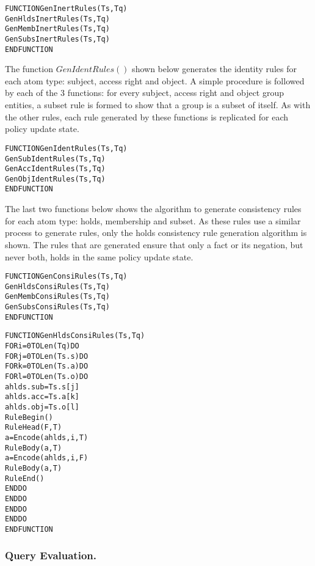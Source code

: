 \documentclass[global,twocolumn,final]{svjour}
\newenvironment{vverbatim}
  {\begin{alltt}}
  {\vspace{-\baselineskip}\end{alltt}}
\begin{document}
          \begin{vverbatim}
FUNCTION GenInertRules(Ts, Tq)
  GenHldsInertRules(Ts, Tq)
  GenMembInertRules(Ts, Tq)
  GenSubsInertRules(Ts, Tq)
ENDFUNCTION
          \end{vverbatim}

          The function $GenIdentRules()$ shown below generates the identity
          rules for each atom type: subject, access right and object. A simple
          procedure is followed by each of the 3 functions: for every subject,
          access right and object group entities, a subset rule is formed to
          show that a group is a subset of itself. As with the other rules,
          each rule generated by these functions is replicated for each policy
          update state.

          \begin{vverbatim}
FUNCTION GenIdentRules(Ts, Tq)
  GenSubIdentRules(Ts, Tq)
  GenAccIdentRules(Ts, Tq)
  GenObjIdentRules(Ts, Tq)
ENDFUNCTION
          \end{vverbatim}

          The last two functions below shows the algorithm to generate
          consistency rules for each atom type: holds, membership and subset.
          As these rules use a similar process to generate rules, only the
          holds consistency rule generation algorithm is shown. The rules that
          are generated ensure that only a fact or its negation, but never
          both, holds in the same policy update state.

          \begin{vverbatim}
FUNCTION GenConsiRules(Ts, Tq)
  GenHldsConsiRules(Ts, Tq)
  GenMembConsiRules(Ts, Tq)
  GenSubsConsiRules(Ts, Tq)
ENDFUNCTION
          \end{vverbatim}

          \begin{vverbatim}
FUNCTION GenHldsConsiRules(Ts, Tq)
  FOR i = 0 TO Len(Tq) DO
    FOR j = 0 TO Len(Ts.s) DO
      FOR k = 0 TO Len(Ts.a) DO
        FOR l = 0 TO Len(Ts.o) DO
          ahlds.sub = Ts.s[j]
          ahlds.acc = Ts.a[k]
          ahlds.obj = Ts.o[l]
          RuleBegin()
          RuleHead(F, T)
          a = Encode(ahlds, i, T)
          RuleBody(a, T)
          a = Encode(ahlds, i, F)
          RuleBody(a, T)
          RuleEnd()
        ENDDO
      ENDDO 
    ENDDO 
  ENDDO
ENDFUNCTION
          \end{vverbatim}

      \subsubsection{Query Evaluation.}
\end{document}
